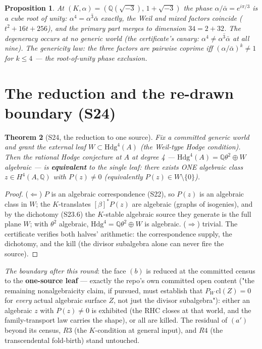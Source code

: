 \documentclass[11pt]{article}
\newtheorem{theorem}{Theorem}[section]
\newtheorem{proposition}[theorem]{Proposition}
\begin{document}
\begin{proposition}\label{prop:degen}
At $(K,\alpha) = (\mathbb{Q}(\sqrt{-3}),\,1+\sqrt{-3})$ the phase
$\alpha/\bar\alpha = e^{i\pi/3}$ is a cube root of unity:
$\alpha^4 = \overline{\alpha^3\bar\alpha}$ exactly, the Weil and mixed
factors coincide ($t^2+16t+256$), and the primary part merges to dimension
$34 = 2 + 32$. The degeneracy occurs at \emph{no} generic world (the
certificate's canary: $\alpha^4 \ne \overline{\alpha^3\bar\alpha}$ at all
nine). The genericity law: the three factors are pairwise coprime iff
$(\alpha/\bar\alpha)^k \ne 1$ for $k \le 4$ --- the root-of-unity phase
exclusion.
\end{proposition}

\section{The reduction and the re-drawn boundary (S24)}

\begin{theorem}[S24, the reduction to one source]\label{thm:s24}
Fix a committed generic world and grant the external leaf
$W \subset \mathrm{Hdg}^4(A)$ (the Weil-type Hodge condition). Then the
rational Hodge conjecture at $A$ at degree 4 ---
$\mathrm{Hdg}^4(A) = \mathbb{Q}\theta^2 \oplus W$ algebraic --- is
\textbf{equivalent} to the single leaf: there exists ONE algebraic class
$z \in H^4(A,\mathbb{Q})$ with $P(z) \ne 0$ (equivalently
$P(z) \in W \setminus \{0\}$).
\end{theorem}

\begin{proof}
($\Leftarrow$) $P$ is an algebraic correspondence (S22), so $P(z)$ is an
algebraic class in $W$; the $K$-translates $[\beta]^*P(z)$ are algebraic
(graphs of isogenies), and by the dichotomy (S23.6) the $K$-stable algebraic
source they generate is the full plane $W$; with $\theta^2$ algebraic,
$\mathrm{Hdg}^4 = \mathbb{Q}\theta^2 \oplus W$ is algebraic.
($\Rightarrow$) trivial. The certificate verifies both halves' arithmetic:
the correspondence supply, the dichotomy, and the kill (the divisor
subalgebra alone can never fire the source).
\end{proof}

\emph{The boundary after this round}: the face $(b)$ is reduced at the
committed census to the \textbf{one-source leaf} --- exactly the repo's own
committed open content ("the remaining nonalgebraicity claim, if pursued,
must establish that $P_W\,\mathrm{cl}(Z) = 0$ for \emph{every} actual
algebraic surface $Z$, not just the divisor subalgebra"): either an
algebraic $z$ with $P(z) \ne 0$ is exhibited (the RHC closes at that world,
and the family-transport law carries the shape), or all are killed. The
residual of $(a')$ beyond its census, $R3$ (the $K$-condition at general
input), and $R4$ (the transcendental fold-birth) stand untouched.
\end{document}
